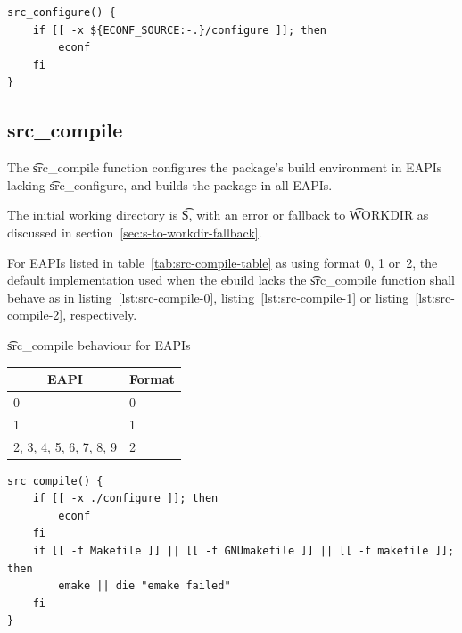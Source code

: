 \begin{listing}[H]
\caption{\t{src_configure}} \label{lst:src-configure-2}
\begin{verbatim}
src_configure() {
    if [[ -x ${ECONF_SOURCE:-.}/configure ]]; then
        econf
    fi
}
\end{verbatim}
\end{listing}

\subsection{src_compile}

 The \t{src_compile} function configures the package's build environment
in EAPIs lacking \t{src_configure}, and builds the package in all EAPIs.

The initial working directory is \t{S}, with an error or fallback to \t{WORKDIR} as discussed in
section~\ref{sec:s-to-workdir-fallback}.

For EAPIs listed in table~\ref{tab:src-compile-table} as using format 0, 1 or~2, the default
implementation used when the ebuild lacks the \t{src_compile} function shall behave as in
listing~\ref{lst:src-compile-0}, listing~\ref{lst:src-compile-1} or listing~\ref{lst:src-compile-2},
respectively.

\begin{centertable}{\t{src_compile} behaviour for EAPIs}
    \label{tab:src-compile-table}
    \begin{tabular}{ll}
      \toprule
      \multicolumn{1}{c}{\textbf{EAPI}} &
      \multicolumn{1}{c}{\textbf{Format}} \\
      \midrule
      0                       & 0 \\
      1                       & 1 \\
      2, 3, 4, 5, 6, 7, 8, 9  & 2 \\
      \bottomrule
    \end{tabular}
\end{centertable}

\begin{listing}[H]
\caption{\t{src_compile}, format~0} \label{lst:src-compile-0}
\begin{verbatim}
src_compile() {
    if [[ -x ./configure ]]; then
        econf
    fi
    if [[ -f Makefile ]] || [[ -f GNUmakefile ]] || [[ -f makefile ]]; then
        emake || die "emake failed"
    fi
}
\end{verbatim}
\end{listing}

